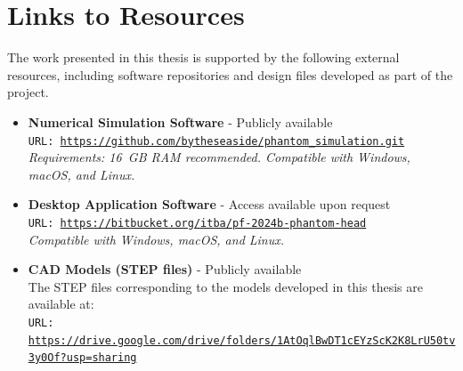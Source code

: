 \section{Links to Resources}

The work presented in this thesis is supported by the following external resources,
including software repositories and design files developed as part of the project.

\begin{itemize}
    \item \textbf{Numerical Simulation Software} - Publicly available \\
    \texttt{URL: \url{https://github.com/bytheseaside/phantom_simulation.git}} \\
    \textit{Requirements: 16~GB RAM recommended. Compatible with Windows, macOS, and Linux.} \\
    
    \item \textbf{Desktop Application Software} - Access available upon request \\
    \texttt{URL: \url{https://bitbucket.org/itba/pf-2024b-phantom-head}} \\
    \textit{Compatible with Windows, macOS, and Linux.} \\

    \item \textbf{CAD Models (STEP files)} - Publicly available \\
    The STEP files corresponding to the models developed in this thesis are available at: \\
    \texttt{URL: \url{https://drive.google.com/drive/folders/1AtOqlBwDT1cEYzScK2K8LrU50tv3y0Of?usp=sharing}}
\end{itemize}
